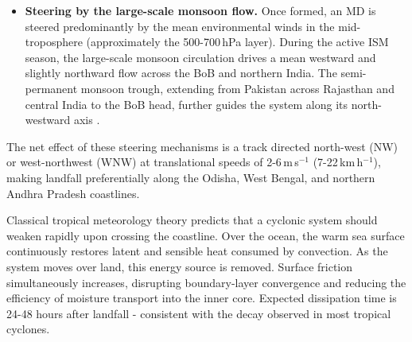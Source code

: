 \begin{itemize}
  \item \textbf{Steering by the large-scale monsoon flow.} Once formed,
    an MD is steered predominantly by the mean environmental winds in
    the mid-troposphere (approximately the 500-700\,hPa layer). During
    the active ISM season, the large-scale monsoon circulation drives
    a mean westward and slightly northward flow across the BoB and
    northern India. The semi-permanent monsoon trough, extending from
    Pakistan across Rajasthan and central India to the BoB head,
    further guides the system along its north-westward axis
    \autocite{mishra2021monsoon, sikka1977}.
\end{itemize}

The net effect of these steering mechanisms is a track directed
north-west (NW) or west-northwest (WNW) at translational speeds of
2-6\,m\,s$^{-1}$ (7-22\,km\,h$^{-1}$), making landfall preferentially
along the Odisha, West Bengal, and northern Andhra Pradesh coastlines.

Classical tropical meteorology theory predicts that a cyclonic system
should weaken rapidly upon crossing the coastline. Over the ocean,
the warm sea surface continuously restores latent and sensible heat
consumed by convection. As the system moves over land, this energy
source is removed. Surface friction simultaneously increases,
disrupting boundary-layer convergence and reducing the efficiency of
moisture transport into the inner core. Expected dissipation time is
24-48 hours after landfall - consistent with the decay observed in
most tropical cyclones.

